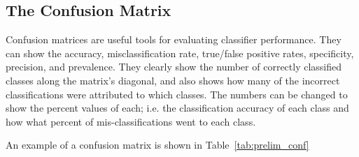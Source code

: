 \subsection{The Confusion Matrix}

Confusion matrices are useful tools for evaluating classifier performance. They can show the accuracy, misclassification rate, true/false positive rates, specificity, precision, and prevalence. They clearly show the number of correctly classified classes along the matrix's diagonal, and also shows how many of the incorrect classifications were attributed to which classes. The numbers can be changed to show the percent values of each; i.e. the classification accuracy of each class and how what percent of mis-classifications went to each class.

An example of a confusion matrix is shown in Table~\ref{tab:prelim_conf}





